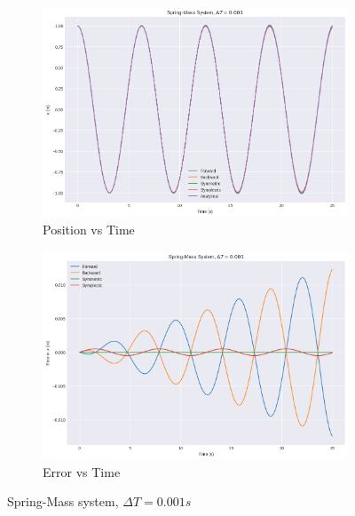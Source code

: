 \documentclass[11pt]{article}
\begin{document}
\begin{figure}[H]
    \centering
    \begin{subfigure}[H]{0.49\linewidth}
        \includegraphics[width=\linewidth]{../sm5.png}
        \caption*{Position vs Time}
    \end{subfigure}
    \begin{subfigure}[H]{0.49\linewidth}
        \includegraphics[width=\linewidth]{../sm6.png}
        \caption*{Error vs Time}
    \end{subfigure}
    \caption*{Spring-Mass system, $\Delta T = 0.001s$}
    \end{figure}
\end{document}
